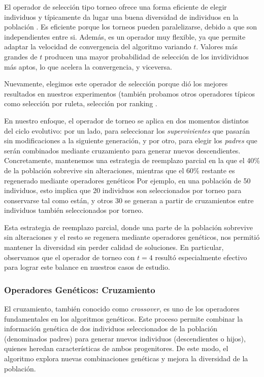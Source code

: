 El operador de selección tipo torneo ofrece una forma eficiente de elegir individuos y típicamente da lugar una buena diversidad de individuos en la población \cite{Goldberg:1989}. Es eficiente porque los torneos pueden paralelizarse, debido a que son independientes entre si. Además, es un operador muy flexible, ya que permite adaptar la velocidad de convergencia del algoritmo variando $t$. Valores más grandes de $t$ producen una mayor probabilidad de selección de los invidividuos más aptos, lo que acelera la convergencia, y viceversa. 

Nuevamente, elegimos este operador de selección porque dió los mejores resultados en nuestros experimentos (también probamos otros operadores típicos como selección por ruleta, selección por ranking \cite{Goldberg:1989}.

En nuestro enfoque, el operador de torneo se aplica en dos momentos distintos del ciclo evolutivo:
por un lado, para seleccionar los \emph{supervivientes} que pasarán sin modificaciones a la siguiente generación,
y por otro, para elegir los \emph{padres} que serán combinados mediante cruzamiento para generar nuevos descendientes.
Concretamente, mantenemos una estrategia de reemplazo parcial en la que el 40\% de la población sobrevive sin alteraciones,
mientras que el 60\% restante es regenerado mediante operadores genéticos
Por ejemplo, en una población de 50 individuos, esto implica que 20 individuos son seleccionados por torneo para conservarse tal como están,
y otros 30 se generan a partir de cruzamientos entre individuos también seleccionados por torneo.

Esta estrategia de reemplazo parcial, donde una parte de la población sobrevive sin alteraciones y el resto se regenera mediante operadores genéticos, 
nos permitió mantener la diversidad sin perder calidad de soluciones.  
En particular, observamos que el operador de torneo con $t=4$ resultó especialmente efectivo para lograr este balance en nuestros casos de estudio.



\subsubsection{Operadores Genéticos: Cruzamiento}
El cruzamiento, también conocido como \emph{crossover}, es uno de los operadores fundamentales en los algoritmos genéticos. 
Este proceso permite combinar la información genética de dos individuos seleccionados de la población (denominados padres) para generar nuevos individuos (descendientes o hijos), 
quienes heredan características de ambos progenitores.
De este modo, el algoritmo explora nuevas combinaciones genéticas y mejora la diversidad de la población.  

